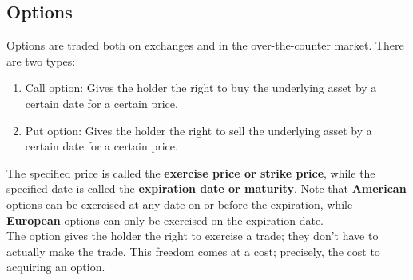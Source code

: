 \documentclass{article}
\begin{document}
\subsection{Options}
Options are traded both on exchanges and in the over-the-counter market. There are two types:
\begin{enumerate}
    \item Call option: Gives the holder the right to buy the underlying asset by a certain date for a certain price.
    \item Put option: Gives the holder the right to sell the underlying asset by a certain date for a certain price.
\end{enumerate}
The specified price is called the \textbf{exercise price or strike price}, while
the specified date is called the \textbf{expiration date or maturity}. Note that 
\textbf{American} options can be exercised at any date on or before the expiration, while
\textbf{European} options can only be exercised on the expiration date.\\
The option gives the holder the right to exercise a trade; they don't have to actually make
the trade. This freedom comes at a cost; precisely, the cost to acquiring an option.
\end{document}
